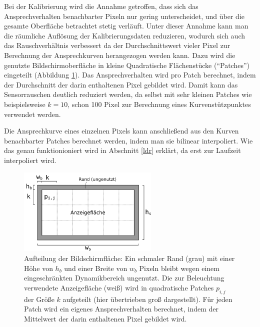   Bei der Kalibrierung wird die Annahme getroffen, dass sich das Ansprechverhalten benachbarter Pixeln nur gering unterscheidet, und über die gesamte Oberfläche betrachtet stetig verläuft.
   Unter dieser Annahme kann man die räumliche Auflösung der Kalibrierungsdaten reduzieren, wodurch sich auch das Rauschverhältnis verbessert da der Durchschnittswert vieler Pixel zur Berechnung der Ansprechkurven herangezogen werden kann.
   Dazu wird die genutzte Bildschirmoberfläche in kleine Quadratische Flächenstücke (``Patches'') eingeteilt (Abbildung \ref{fig:patches}). 
   Das Ansprechverhalten wird pro Patch berechnet, indem der Durchschnitt der darin enthaltenen Pixel gebildet wird.
   Damit kann das Sensorrauschen deutlich reduziert werden, da selbst mit sehr kleinen Patches wie beispielsweise $k=10$, schon 100 Pixel zur Berechnung eines Kurvenstützpunktes verwendet werden.
   
   Die Ansprechkurve eines einzelnen Pixels kann anschließend aus den Kurven benachbarter Patches berechnet werden, indem man sie bilinear interpoliert.
   Wie das genau funktionioniert wird in Abschnitt \ref{ldr} erklärt, da erst zur Laufzeit interpoliert wird.

   \begin{figure}[h]
    \centering
    \includegraphics[width=0.6\textwidth]{../graphics/kalibrierung/patches.svg}
    \caption[Aufteilung der Bildschirmfläche]{
          Aufteilung der Bildschirmfläche: 
          Ein schmaler Rand  (grau) mit einer Höhe von $h_b$ und einer Breite von $w_b$ Pixeln bleibt wegen einem eingeschränkten Dynamikbereich ungenutzt.
          Die zur Beleuchtung verwendete Anzeigefläche (weiß) wird in quadratische Patches $p_{i,j}$ der Größe $k$ aufgeteilt (hier übertrieben groß dargestellt).
          Für jeden Patch wird ein eigenes Ansprechverhalten berechnet, indem der Mittelwert der darin enthaltenen Pixel gebildet wird.
          }
    \label{fig:patches}
   \end{figure}

